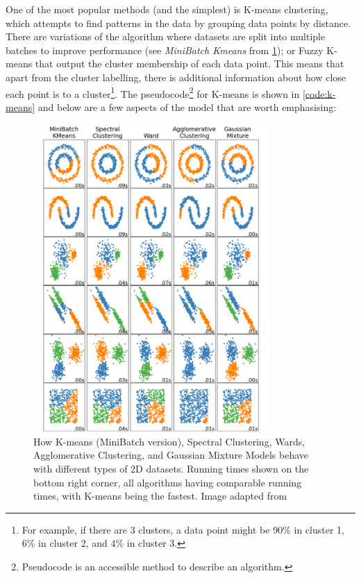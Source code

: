 One of the most popular methods (and the simplest) is K-means clustering, which attempts to find patterns in the data by grouping data points by distance. There are variations of the algorithm where datasets are split into multiple batches to improve performance (see \textit{MiniBatch Kmeans} from \cref{fig:lit:clustering_types}); or Fuzzy K-means \citep{Bezdek1984-ao} that output the cluster membership of each data point. This means that apart from the cluster labelling, there is additional information about how close each point is to a cluster\footnote{For example, if there are 3 clusters, a data point might be 90\% in cluster 1, 6\% in cluster 2, and 4\% in cluster 3.}. 
The pseudocode\footnote{Pseudocode is an accessible method to describe an algorithm.} for K-means is shown in \cref{code:k-means} and below are a few aspects of the model that are worth emphasising:
\begin{figure}[!t]
  \centering
  \includegraphics[width=0.8\textwidth,height=0.5\textheight,keepaspectratio]{Sections/Lit_review/Resources/clustering_scikit.png}
    \caption{How K-means (MiniBatch version), Spectral Clustering, Wards, Agglomerative Clustering, and Gaussian Mixture Models behave with different types of 2D datasets. Running times shown on the bottom right corner, all algorithms having comparable running times, with K-means being the fastest. Image adapted from \cite{Scikit-learn_undated-ax}}
    \label{fig:lit:clustering_types}
\end{figure}

